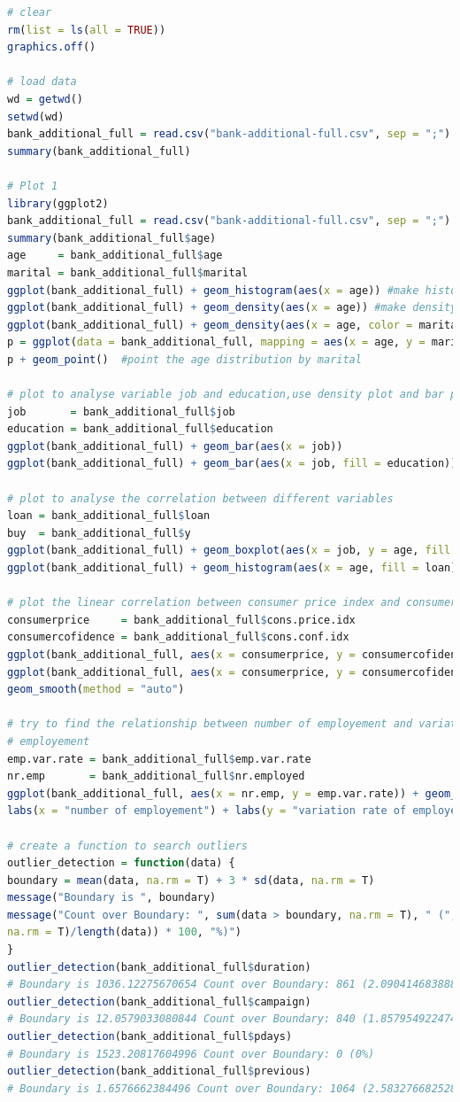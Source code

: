 \documentclass[12pt, a4paper, bibliography=totoc, english]{scrartcl}
\begin{document}
\begin{lstlisting}[language = R]
# clear
rm(list = ls(all = TRUE))
graphics.off()

# load data
wd = getwd()
setwd(wd)
bank_additional_full = read.csv("bank-additional-full.csv", sep = ";")
summary(bank_additional_full)

# Plot 1
library(ggplot2)
bank_additional_full = read.csv("bank-additional-full.csv", sep = ";")
summary(bank_additional_full$age)
age     = bank_additional_full$age
marital = bank_additional_full$marital
ggplot(bank_additional_full) + geom_histogram(aes(x = age)) #make histogram of age distribution
ggplot(bank_additional_full) + geom_density(aes(x = age)) #make density of age distribution
ggplot(bank_additional_full) + geom_density(aes(x = age, color = marital))
p = ggplot(data = bank_additional_full, mapping = aes(x = age, y = marital))
p + geom_point()  #point the age distribution by marital

# plot to analyse variable job and education,use density plot and bar plot
job       = bank_additional_full$job
education = bank_additional_full$education
ggplot(bank_additional_full) + geom_bar(aes(x = job))
ggplot(bank_additional_full) + geom_bar(aes(x = job, fill = education))

# plot to analyse the correlation between different variables
loan = bank_additional_full$loan
buy  = bank_additional_full$y
ggplot(bank_additional_full) + geom_boxplot(aes(x = job, y = age, fill = buy))
ggplot(bank_additional_full) + geom_histogram(aes(x = age, fill = loan))

# plot the linear correlation between consumer price index and consumer confidence
consumerprice     = bank_additional_full$cons.price.idx
consumercofidence = bank_additional_full$cons.conf.idx
ggplot(bank_additional_full, aes(x = consumerprice, y = consumercofidence)) + geom_point()
ggplot(bank_additional_full, aes(x = consumerprice, y = consumercofidence)) + geom_point() + 
geom_smooth(method = "auto")

# try to find the relationship between number of employement and variation rate of
# employement
emp.var.rate = bank_additional_full$emp.var.rate
nr.emp       = bank_additional_full$nr.employed
ggplot(bank_additional_full, aes(x = nr.emp, y = emp.var.rate)) + geom_point() + geom_smooth(method = 'auto') + 
labs(x = "number of employement") + labs(y = "variation rate of employement")

# create a function to search outliers
outlier_detection = function(data) {
boundary = mean(data, na.rm = T) + 3 * sd(data, na.rm = T)
message("Boundary is ", boundary)
message("Count over Boundary: ", sum(data > boundary, na.rm = T), " (", (sum(data > boundary, 
na.rm = T)/length(data)) * 100, "%)")
}
outlier_detection(bank_additional_full$duration)
# Boundary is 1036.12275670654 Count over Boundary: 861 (2.09041468388851%)
outlier_detection(bank_additional_full$campaign)
# Boundary is 12.0579033080844 Count over Boundary: 840 (1.85795492247462%)
outlier_detection(bank_additional_full$pdays)
# Boundary is 1523.20817604996 Count over Boundary: 0 (0%)
outlier_detection(bank_additional_full$previous)
# Boundary is 1.6576662384496 Count over Boundary: 1064 (2.58327668252889%)


\end{lstlisting}
\end{document}
